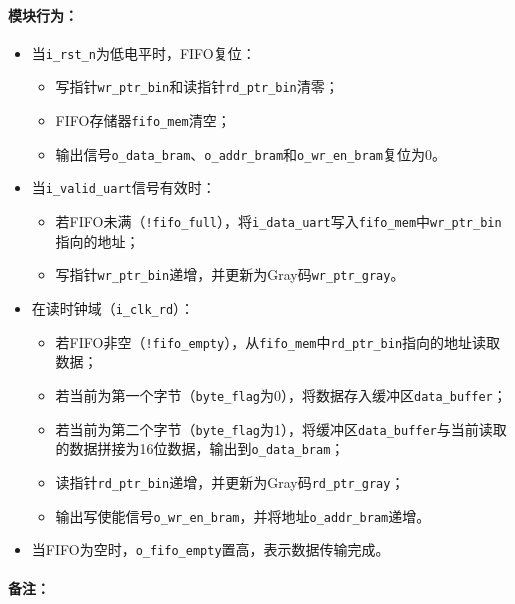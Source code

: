 \documentclass[lang=cn,a4paper,newtx]{elegantpaper}
\begin{document}
\paragraph{模块行为：}
\begin{itemize}
  \item 当\texttt{i\_rst\_n}为低电平时，FIFO复位：
    \begin{itemize}
      \item 写指针\texttt{wr\_ptr\_bin}和读指针\texttt{rd\_ptr\_bin}清零；
      \item FIFO存储器\texttt{fifo\_mem}清空；
      \item 输出信号\texttt{o\_data\_bram}、\texttt{o\_addr\_bram}和\texttt{o\_wr\_en\_bram}复位为0。
    \end{itemize}
  \item 当\texttt{i\_valid\_uart}信号有效时：
    \begin{itemize}
      \item 若FIFO未满（\texttt{!fifo\_full}），将\texttt{i\_data\_uart}写入\texttt{fifo\_mem}中\texttt{wr\_ptr\_bin}指向的地址；
      \item 写指针\texttt{wr\_ptr\_bin}递增，并更新为Gray码\texttt{wr\_ptr\_gray}。
    \end{itemize}
  \item 在读时钟域（\texttt{i\_clk\_rd}）：
    \begin{itemize}
      \item 若FIFO非空（\texttt{!fifo\_empty}），从\texttt{fifo\_mem}中\texttt{rd\_ptr\_bin}指向的地址读取数据；
      \item 若当前为第一个字节（\texttt{byte\_flag}为0），将数据存入缓冲区\texttt{data\_buffer}；
      \item 若当前为第二个字节（\texttt{byte\_flag}为1），将缓冲区\texttt{data\_buffer}与当前读取的数据拼接为16位数据，输出到\texttt{o\_data\_bram}；
      \item 读指针\texttt{rd\_ptr\_bin}递增，并更新为Gray码\texttt{rd\_ptr\_gray}；
      \item 输出写使能信号\texttt{o\_wr\_en\_bram}，并将地址\texttt{o\_addr\_bram}递增。
    \end{itemize}
  \item 当FIFO为空时，\texttt{o\_fifo\_empty}置高，表示数据传输完成。
\end{itemize}
\paragraph{备注：}
\end{document}
